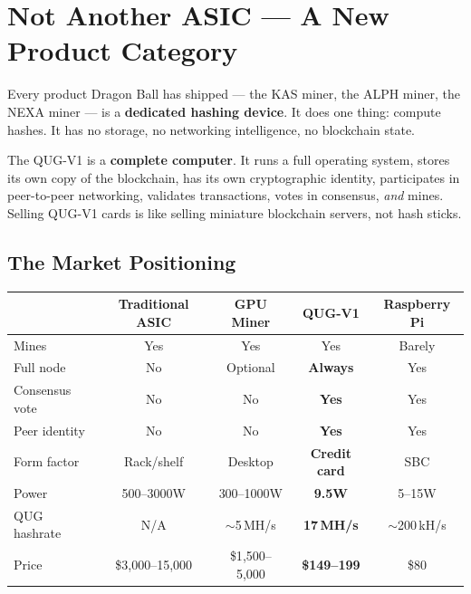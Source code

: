 \documentclass[11pt,a4paper]{article}
\begin{document}
\section{Not Another ASIC --- A New Product Category}

\begin{highlight}
Every product Dragon Ball has shipped --- the KAS miner, the ALPH miner, the NEXA miner --- is a \textbf{dedicated hashing device}. It does one thing: compute hashes. It has no storage, no networking intelligence, no blockchain state.

The QUG-V1 is a \textbf{complete computer}. It runs a full operating system, stores its own copy of the blockchain, has its own cryptographic identity, participates in peer-to-peer networking, validates transactions, votes in consensus, \textit{and} mines. Selling QUG-V1 cards is like selling miniature blockchain servers, not hash sticks.
\end{highlight}

\subsection{The Market Positioning}

\begin{center}
\begin{tabular}{@{}p{3.5cm}cccc@{}}
\toprule
 & \textbf{Traditional ASIC} & \textbf{GPU Miner} & \textbf{QUG-V1} & \textbf{Raspberry Pi} \\
\midrule
Mines & Yes & Yes & Yes & Barely \\
Full node & No & Optional & \textcolor{qnkgreen}{\textbf{Always}} & Yes \\
Consensus vote & No & No & \textcolor{qnkgreen}{\textbf{Yes}} & Yes \\
Peer identity & No & No & \textcolor{qnkgreen}{\textbf{Yes}} & Yes \\
Form factor & Rack/shelf & Desktop & \textcolor{qnkgreen}{\textbf{Credit card}} & SBC \\
Power & 500--3000W & 300--1000W & \textcolor{qnkgreen}{\textbf{9.5W}} & 5--15W \\
QUG hashrate & N/A & $\sim$5\,MH/s & \textcolor{qnkgreen}{\textbf{17\,MH/s}} & $\sim$200\,kH/s \\
Price & \$3{,}000--15{,}000 & \$1{,}500--5{,}000 & \textcolor{qnkgreen}{\textbf{\$149--199}} & \$80 \\
\bottomrule
\end{tabular}
\end{center}
\end{document}
